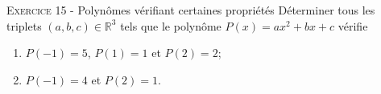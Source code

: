 

\vskip0.3cm\noindent\textsc{Exercice 15} - Polynômes vérifiant certaines propriétés
\vskip0.2cm
Déterminer tous les triplets $(a,b,c)\in\mathbb R^3$ tels que le polynôme $P(x)=ax^2+bx+c$ vérifie
\begin{enumerate}
 \item $P(-1)=5$, $P(1)=1$ et $P(2)=2$;
 \item $P(-1)=4$ et $P(2)=1$.
\end{enumerate}




\vskip0.5cm

